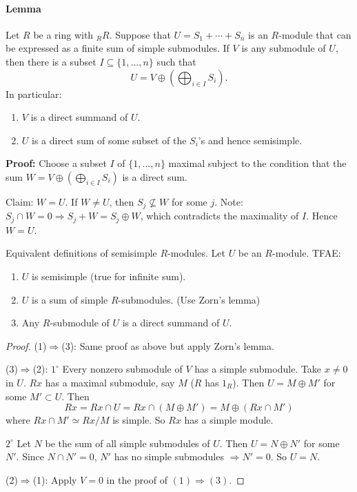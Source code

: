 \documentclass[11pt, a4paper]{report}
\begin{document}
\paragraph{Lemma}
Let $R$ be a ring with ${}_R R$. Suppose that $U = S_1 + \cdots + S_n$ is an $R$-module that can be expressed as a finite sum of simple submodules. If $V$ is any submodule of $U$, then there is a subset $I \subseteq \{1, \ldots, n\}$ such that
\[ U = V \oplus \left( \bigoplus_{i \in I} S_i \right). \]
In particular:
\begin{enumerate}
\item[(1)] $V$ is a direct summand of $U$.
\item[(2)] $U$ is a direct sum of some subset of the $S_i$'s and hence semisimple.
\end{enumerate}

\textbf{Proof:} Choose a subset $I$ of $\{1, \ldots, n\}$ maximal subject to the condition that the sum $W = V \oplus \left( \bigoplus_{i \in I} S_i \right)$ is a direct sum.

Claim: $W = U$. If $W \neq U$, then $S_j \not\subseteq W$ for some $j$. Note: $S_j \cap W = 0 \Rightarrow S_j + W = S_j \oplus W$, which contradicts the maximality of $I$. Hence $W = U$.

\begin{corollary}
Equivalent definitions of semisimple $R$-modules.
Let $U$ be an $R$-module. TFAE:
\begin{enumerate}
    \item $U$ is semisimple (true for infinite sum).
    \item $U$ is a sum of simple $R$-submodules. (Use Zorn's lemma)
    \item Any $R$-submodule of $U$ is a direct summand of $U$.
\end{enumerate}

\end{corollary}

\begin{proof}
(1)$\Rightarrow$(3): Same proof as above but apply Zorn's lemma.

(3)$\Rightarrow$(2):
$1^{\circ}$ Every nonzero submodule of $V$ has a simple submodule.
Take $x \neq 0$ in $U$. $Rx$ has a maximal submodule, say $M$ ($R$ has $1_{R}$).
Then $U = M \oplus M'$ for some $M' \subset U$. Then
\[ Rx = Rx \cap U = Rx \cap (M \oplus M') = M \oplus (Rx \cap M') \]
where $Rx \cap M' \simeq Rx / M$ is simple. So $Rx$ has a simple module.

$2^{\circ}$ Let $N$ be the sum of all simple submodules of $U$. Then $U = N \oplus N'$ for some $N'$.
Since $N \cap N' = 0$, $N'$ has no simple submodules $\Rightarrow N' = 0$. So $U = N$.

(2)$\Rightarrow$(1): Apply $V = 0$ in the proof of $(1) \Rightarrow (3)$.
\end{proof}
\end{document}
